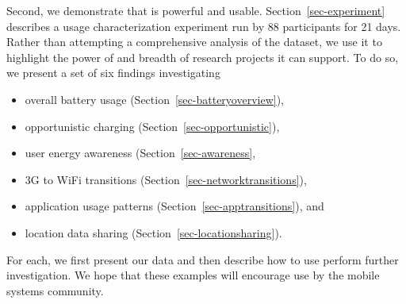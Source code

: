 

Second, we demonstrate that \PhoneLab{} is powerful and usable.
Section~\ref{sec-experiment} describes a usage characterization experiment
run by 88 \PhoneLab{} participants for 21 days. Rather than attempting a
comprehensive analysis of the dataset, we use it to highlight the power of
\PhoneLab{} and breadth of research projects it can support. To do so, we
present a set of six findings investigating

\begin{itemize}[nosep]
\vspace*{0.1in}
\item overall battery usage (Section~\ref{sec-batteryoverview}),
\item opportunistic charging (Section~\ref{sec-opportunistic}),
\item user energy awareness (Section~\ref{sec-awareness},
\item 3G to WiFi transitions (Section~\ref{sec-networktransitions}),
\item application usage patterns (Section~\ref{sec-apptransitions}), and
\item location data sharing (Section~\ref{sec-locationsharing}).
\vspace*{0.1in}
\end{itemize}

For each, we first present our data and then describe how to use \PhoneLab{}
perform further investigation. We hope that these examples will encourage
\PhoneLab{} use by the mobile systems community.
